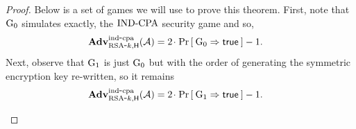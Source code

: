 \begin{proof}
Below is a set of games we will use to prove this theorem. First, note that $\G_0$ simulates exactly, the $\INDCPA$ security game and so, 
\begin{align*}
\AdvINDCPA{\RSAk,\Horacle}{\advA} &= 2\cdotsm \Prob{\G_0\Rightarrow \true}  - 1.
\end{align*}
Next, observe that $\G_1$ is just $\G_0$ but with the order of generating the symmetric encryption key re-written, so it remains
\begin{align*}
\AdvINDCPA{\RSAk,\Horacle}{\advA} &= 2\cdotsm \Prob{\G_1\Rightarrow \true}  - 1.
\end{align*}
\begin{center}
\end{center}
\end{proof}

